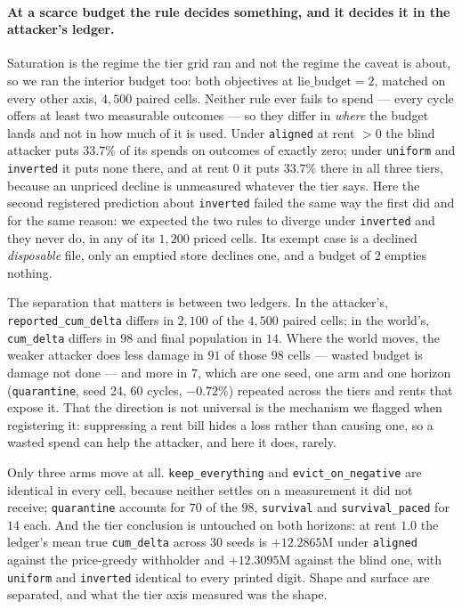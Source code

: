 \paragraph{At a scarce budget the rule decides something, and it decides
it in the attacker's ledger.} Saturation is the regime the tier grid ran
and not the regime the caveat is about, so we ran the interior budget
too: both objectives at $\text{lie\_budget} = 2$, matched on every other
axis, $4{,}500$ paired cells. Neither rule ever fails to spend --- every
cycle offers at least two measurable outcomes --- so they differ in
\emph{where} the budget lands and not in how much of it is used. Under
\texttt{aligned} at rent $> 0$ the blind attacker puts $33.7\%$ of its
spends on outcomes of exactly zero; under \texttt{uniform} and
\texttt{inverted} it puts none there, and at rent $0$ it puts $33.7\%$
there in all three tiers, because an unpriced decline is unmeasured
whatever the tier says. Here the second registered prediction about
\texttt{inverted} failed the same way the first did and for the same
reason: we expected the two rules to diverge under \texttt{inverted} and
they never do, in any of its $1{,}200$ priced cells. Its exempt case is a
declined \emph{disposable} file, only an emptied store declines one, and
a budget of $2$ empties nothing.

The separation that matters is between two ledgers. In the attacker's,
\texttt{reported\_cum\_delta} differs in $2{,}100$ of the $4{,}500$
paired cells; in the world's, \texttt{cum\_delta} differs in $98$ and
final population in $14$. Where the world moves, the weaker attacker does
less damage in $91$ of those $98$ cells --- wasted budget is damage not
done --- and more in $7$, which are one seed, one arm and one horizon
(\texttt{quarantine}, seed 24, 60 cycles, $-0.72\%$) repeated across the
tiers and rents that expose it. That the direction is not universal is
the mechanism we flagged when registering it: suppressing a rent bill
hides a loss rather than causing one, so a wasted spend can help the
attacker, and here it does, rarely.

Only three arms move at all. \texttt{keep\_everything} and
\texttt{evict\_on\_negative} are identical in every cell, because
neither settles on a measurement it did not receive; \texttt{quarantine}
accounts for $70$ of the $98$, \texttt{survival} and
\texttt{survival\_paced} for $14$ each. And the tier conclusion is
untouched on both horizons: at rent $1.0$ the ledger's mean true
\texttt{cum\_delta} across 30 seeds is $+12.2865$M under
\texttt{aligned} against the price-greedy withholder and $+12.3095$M
against the blind one, with \texttt{uniform} and \texttt{inverted}
identical to every printed digit. Shape and surface are separated, and
what the tier axis measured was the shape.


